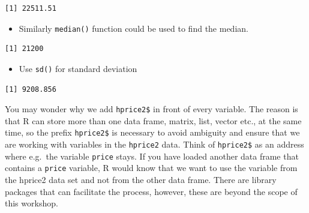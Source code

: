 \documentclass[
  letterpaper,
  DIV=11,
  numbers=noendperiod]{scrreprt}
\newenvironment{Shaded}{\begin{snugshade}}{\end{snugshade}}
\newcommand{\CommentTok}[1]{\textcolor[rgb]{0.37,0.37,0.37}{#1}}
\newcommand{\FunctionTok}[1]{\textcolor[rgb]{0.28,0.35,0.67}{#1}}
\newcommand{\NormalTok}[1]{\textcolor[rgb]{0.00,0.23,0.31}{#1}}
\newcommand{\SpecialCharTok}[1]{\textcolor[rgb]{0.37,0.37,0.37}{#1}}
\providecommand{\tightlist}{%
  \setlength{\itemsep}{0pt}\setlength{\parskip}{0pt}}\usepackage{longtable,booktabs,array}
\begin{document}
\begin{Shaded}
\end{Shaded}

\begin{verbatim}
[1] 22511.51
\end{verbatim}

\begin{itemize}
\tightlist
\item
  Similarly \texttt{median()} function could be used to find the median.
\end{itemize}

\begin{Shaded}
\end{Shaded}

\begin{verbatim}
[1] 21200
\end{verbatim}

\begin{itemize}
\tightlist
\item
  Use \texttt{sd()} for standard deviation
\end{itemize}

\begin{Shaded}
\end{Shaded}

\begin{verbatim}
[1] 9208.856
\end{verbatim}

You may wonder why we add \texttt{hprice2\$} in front of every variable.
The reason is that R can store more than one data frame, matrix, list,
vector etc., at the same time, so the prefix \texttt{hprice2\$} is
necessary to avoid ambiguity and ensure that we are working with
variables in the \texttt{hprice2} data. Think of \texttt{hprice2\$} as
an address where e.g.~the variable \texttt{price} stays. If you have
loaded another data frame that contains a \texttt{price} variable, R
would know that we want to use the variable from the hprice2 data set
and not from the other data frame. There are library packages that can
facilitate the process, however, these are beyond the scope of this
workshop.
\end{document}
